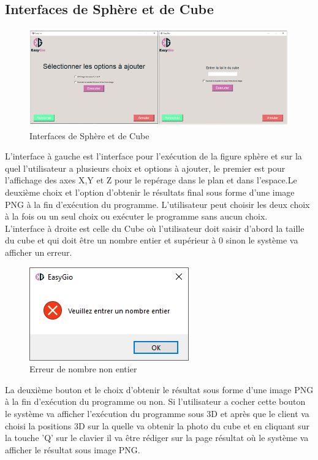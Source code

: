 \documentclass[a4paper]{report}
\begin{document}
\subsection{Interfaces de Sphère et de Cube}
\begin{figure}[!h]
    \centering
    \includegraphics[width=15cm]{images/SpCube.PNG}
    \caption{Interfaces de Sphère et de Cube}
    \label{fig:Interfaces de Sphère et de Cube}
\end{figure}
L'interface à gauche est l'interface pour l'exécution de la figure sphère et sur la quel l'utilisateur a plusieurs choix et options à ajouter, le premier est pour l'affichage des axes X,Y et Z pour le repérage dans le plan et dans l'espace.Le deuxième choix et l'option d'obtenir le résultats final sous forme d'une image PNG à la fin d'exécution du programme. L'utilisateur peut choisir les deux choix à la fois ou un seul choix ou exécuter le programme sans aucun choix.\\
L'interface à droite est celle du Cube où l'utilisateur doit saisir d'abord la taille du cube et qui doit être un nombre entier et supérieur à 0 sinon le système va afficher un erreur.\\
\begin{figure}[!h]
    \centering
    \includegraphics{images/NbError.PNG}
    \caption{Erreur de nombre non entier}
    \label{fig:Erreur de nombre non entier}
\end{figure}
\newpage
La deuxième bouton et le choix d'obtenir le résultat sous forme d'une image PNG à la fin d'exécution du programme ou non. Si l'utilisateur a cocher cette bouton le système va afficher l'exécution du programme sous 3D et après que le client va choisi la positions 3D sur la quelle va obtenir la photo du cube et en cliquant sur la touche 'Q' sur le clavier il va être rédiger sur la page résultat où le système va afficher le résultat sous image PNG.\\
\end{document}
